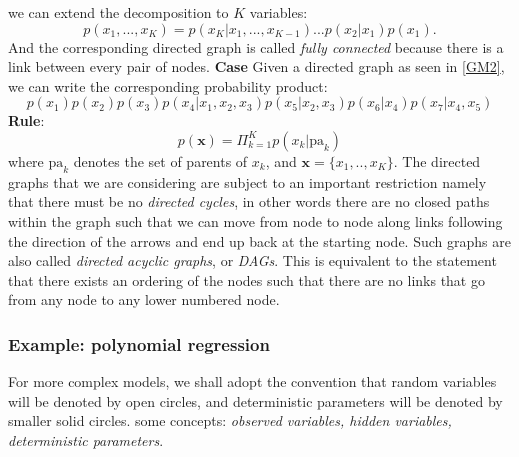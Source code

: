 \documentclass[a4paper]{book}
\begin{document}
\newline
we can extend the decomposition to $K$ variables:
\begin{equation}
    p(x_1,...,x_K) = p(x_K|x_1,...,x_{K-1})...p(x_2|x_1)p(x_1).
    \label{eq8.2}
\end{equation}
And the corresponding directed graph is called \textit{fully connected} because there is a link between every pair of nodes.
\newline
\textbf{Case} Given a directed graph as seen in \ref{GM2}, we can write the corresponding probability product:
\begin{equation}
    p(x_1)p(x_2)p(x_3)p(x_4|x_1,x_2,x_3)p(x_5|x_2,x_3)p(x_6|x_4)p(x_7|x_4,x_5)
    \label{8.3}
\end{equation}
\textbf{Rule}:
\begin{equation}
p(\textbf{x}) = \Pi_{k=1}^Kp(x_k|\mathrm{pa}_k)
\label{8.4}
\end{equation}
where $\mathrm{pa}_k$ denotes the set of parents of $x_k$, and $\textbf{x} = \{x_1,..,x_K\}$.
\newline
The directed graphs that we are considering are subject to an important restriction namely that there must be no \textit{directed cycles}, in other words there are no closed paths within the graph such that we can move from node to node along links following the direction of the arrows and end up back at the starting node. Such graphs are also called \textit{directed acyclic graphs}, or \textit{DAGs}. This is equivalent to the statement that there exists an ordering of the nodes such that there are no links that go from any node to any lower numbered node.
\subsubsection{Example: polynomial regression}
For more complex models, we shall adopt the convention that random variables will be denoted by open circles, and deterministic parameters will be denoted by smaller solid circles.
some concepts: \textit{observed variables, hidden variables, deterministic parameters}.
\end{document}
